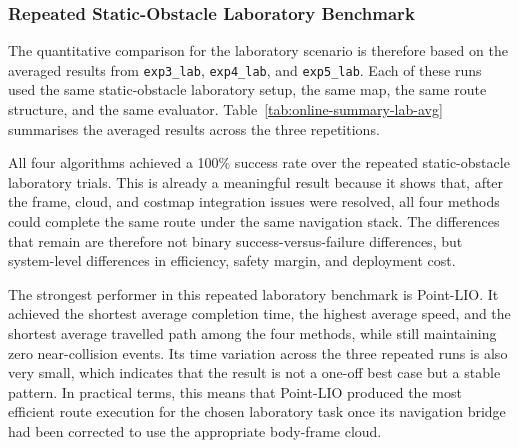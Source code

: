 \documentclass[12pt,a4paper]{report}
\begin{document}
\subsubsection{Repeated Static-Obstacle Laboratory Benchmark}
The quantitative comparison for the laboratory scenario is therefore based on the averaged results from \texttt{exp3\_lab}, \texttt{exp4\_lab}, and \texttt{exp5\_lab}. Each of these runs used the same static-obstacle laboratory setup, the same map, the same route structure, and the same evaluator. Table~\ref{tab:online-summary-lab-avg} summarises the averaged results across the three repetitions.

\begin{table}[H]
\centering
\scriptsize
\caption{Average online results over the repeated indoor laboratory static-obstacle trials (\texttt{exp3\_lab}, \texttt{exp4\_lab}, and \texttt{exp5\_lab}).}
\label{tab:online-summary-lab-avg}
\setlength{\tabcolsep}{3pt}
\renewcommand{\arraystretch}{1.05}
\end{table}

All four algorithms achieved a 100\% success rate over the repeated static-obstacle laboratory trials. This is already a meaningful result because it shows that, after the frame, cloud, and costmap integration issues were resolved, all four methods could complete the same route under the same navigation stack. The differences that remain are therefore not binary success-versus-failure differences, but system-level differences in efficiency, safety margin, and deployment cost.

The strongest performer in this repeated laboratory benchmark is Point-LIO. It achieved the shortest average completion time, the highest average speed, and the shortest average travelled path among the four methods, while still maintaining zero near-collision events. Its time variation across the three repeated runs is also very small, which indicates that the result is not a one-off best case but a stable pattern. In practical terms, this means that Point-LIO produced the most efficient route execution for the chosen laboratory task once its navigation bridge had been corrected to use the appropriate body-frame cloud.
\end{document}

